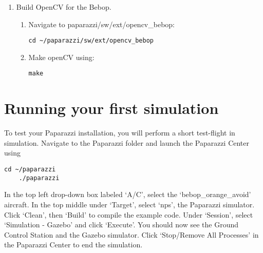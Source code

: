 \begin{enumerate}
	\item Build OpenCV for the Bebop.
	\begin{enumerate}
		\item Navigate to paparazzi/sw/ext/opencv\_bebop:
		\begin{lstlisting}[style=Bash]
			cd ~/paparazzi/sw/ext/opencv_bebop
		\end{lstlisting}
		
		\item Make openCV using:
		\begin{lstlisting}[style=Bash]
			make
		\end{lstlisting}
	\end{enumerate}
\end{enumerate}


\section{Running your first simulation}
To test your Paparazzi installation, you will perform a short test-flight in simulation.
Navigate to the Paparazzi folder and launch the Paparazzi Center using

\begin{lstlisting}[style=Bash]
	cd ~/paparazzi
	./paparazzi
\end{lstlisting}

In the top left drop-down box labeled `A/C', select the `bebop\_orange\_avoid' aircraft.
In the top middle under `Target', select `nps', the Paparazzi simulator.
Click `Clean', then `Build' to compile the example code.
Under `Session', select `Simulation - Gazebo' and click `Execute'. You should now see the Ground Control Station and the Gazebo simulator.
Click `Stop/Remove All Processes' in the Paparazzi Center to end the simulation.

